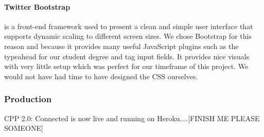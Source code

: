 		\paragraph{Twitter Bootstrap\cite{bootstrap}} is a front-end framework used to present a clean and simple user interface that supports dynamic scaling to different screen sizes. We chose Bootstrap for this reason and because it provides many useful JavaScript plugins such as the typeahead for our student degree and tag input fields. It provides nice visuals with very little setup which was perfect for our timeframe of this project. We would not have had time to have designed the CSS ourselves.

	\subsubsection{Production}
		CPP 2.0: Connected is now live and running on Heroku\cite{heroku}....[FINISH ME PLEASE SOMEONE]